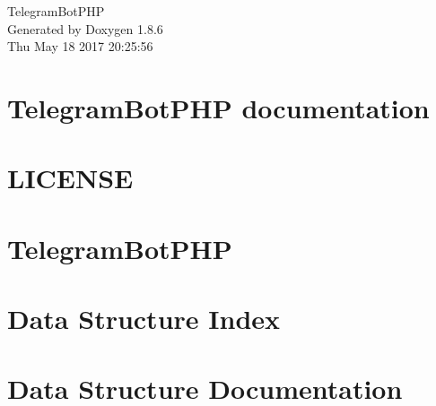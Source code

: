 \documentclass[twoside]{book}
\newcommand{\clearemptydoublepage}{%
  \newpage{\pagestyle{empty}\cleardoublepage}%
}
\begin{document}
\hypersetup{pageanchor=false}
\begin{titlepage}
\vspace*{7cm}
\begin{center}%
{\Large Telegram\-Bot\-P\-H\-P }\\
\vspace*{1cm}
{\large Generated by Doxygen 1.8.6}\\
\vspace*{0.5cm}
{\small Thu May 18 2017 20:25:56}\\
\end{center}
\end{titlepage}
\clearemptydoublepage
\tableofcontents
\clearemptydoublepage
{}
\hypersetup{pageanchor=true}

\chapter{Telegram\-Bot\-P\-H\-P documentation}
\label{index}\hypertarget{index}{}
\chapter{L\-I\-C\-E\-N\-S\-E}
\label{md__home_travis_build__eleirbag89__telegram_bot_p_h_p__l_i_c_e_n_s_e}
\hypertarget{md__home_travis_build__eleirbag89__telegram_bot_p_h_p__l_i_c_e_n_s_e}{}

\chapter{Telegram\-Bot\-P\-H\-P}
\label{md__home_travis_build__eleirbag89__telegram_bot_p_h_p__r_e_a_d_m_e}
\hypertarget{md__home_travis_build__eleirbag89__telegram_bot_p_h_p__r_e_a_d_m_e}{}

\chapter{Data Structure Index}

\chapter{Data Structure Documentation}



\newpage
{}
{}
\printindex
\end{document}
